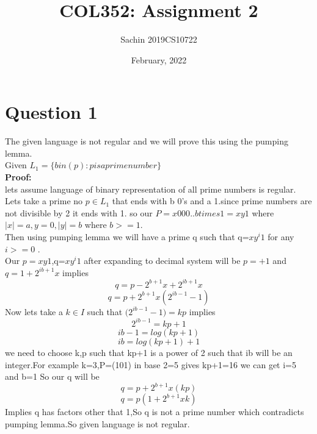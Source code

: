 \documentclass{article}
\title{COL352: Assignment 2}
\author{Sachin 2019CS10722 }
\date{February, 2022}
\begin{document}
\maketitle


\section{Question 1}
The given language is not regular and we will prove this using the pumping lemma. \\
Given $L_1 = \{bin(p): p is a prime number\}$\\
\textbf{Proof:}\\lets assume language of binary representation of all prime numbers is regular.\\
Lets take a prime no $p \in L_1$ that ends with b 0's and a 1.since prime numbers are not divisible by 2 it ends with 1.
so our $P = x000..btimes1=xy1$ where $|x| = a,y=0 ,|y|=b$ where $b>=1.$\\
Then using pumping lemma we will have a prime q such that q=$x{y^i}1$ for any $i>=0$ .\\
Our $p=xy1$,q=$x{y^i}1$ after expanding to decimal system will be $p=+1$ and 
$q=1+{2^{ib+1}}x$ implies
$$q = p - {2^{b+1}}x + {2^{ib+1}}x $$
$$q = p +2^{b+1}x({2^{ib-1}-1})$$
Now lets take a $k \in I$ such that $({2^{ib-1}-1)}= kp$ implies
$$2^{ib-1}=kp+1$$
$$ib-1=log(kp+1)$$
$$ib=log(kp+1)+1$$
we need to choose k,p such that kp+1 is a power of 2 such that ib will be an integer.For example k=3,P=(101) in base 2=5
gives kp+1=16 we can get i=5 and b=1
So our q will be $$q=p+2^{b+1}x(kp)$$
$$q=p(1+2^{b+1}xk)$$
Implies q has factors other that 1,So q is not a prime number which contradicts pumping lemma.So given language is not regular.



\pagebreak
\end{document}
